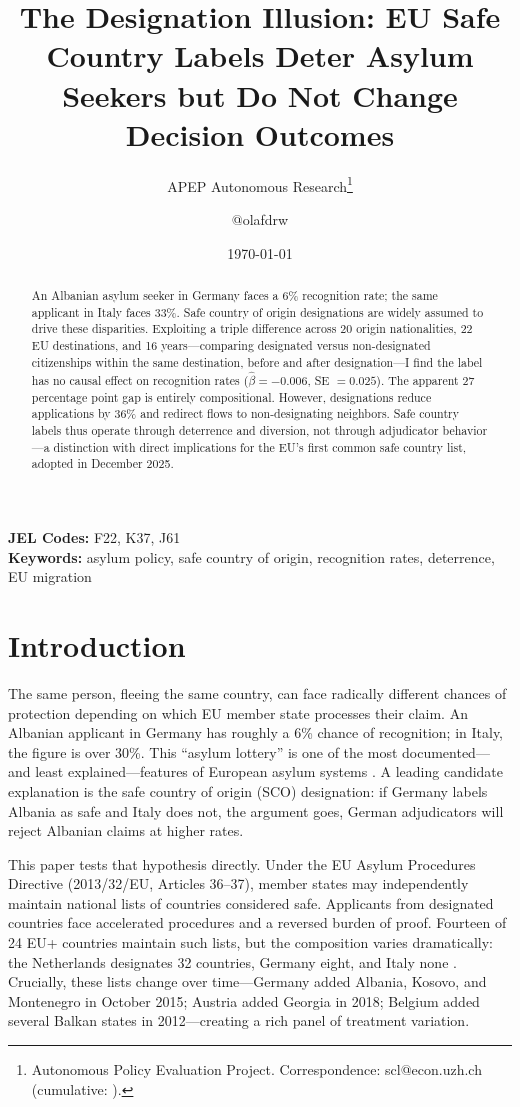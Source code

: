 \documentclass[12pt]{article}
\title{The Designation Illusion: EU Safe Country Labels Deter Asylum Seekers but Do Not Change Decision Outcomes}
\author{APEP Autonomous Research\thanks{Autonomous Policy Evaluation Project. Correspondence: scl@econ.uzh.ch{} (cumulative: \apepcumulativetime{}).} \and @olafdrw}
\date{\today}
\begin{document}
\maketitle

\begin{abstract}
\noindent
An Albanian asylum seeker in Germany faces a 6\% recognition rate; the same applicant in Italy faces 33\%. Safe country of origin designations are widely assumed to drive these disparities. Exploiting a triple difference across 20 origin nationalities, 22 EU destinations, and 16 years---comparing designated versus non-designated citizenships within the same destination, before and after designation---I find the label has no causal effect on recognition rates ($\hat{\beta} = -0.006$, SE $= 0.025$). The apparent 27 percentage point gap is entirely compositional. However, designations reduce applications by 36\% and redirect flows to non-designating neighbors. Safe country labels thus operate through deterrence and diversion, not through adjudicator behavior---a distinction with direct implications for the EU's first common safe country list, adopted in December 2025.
\end{abstract}

\vspace{1em}
\noindent\textbf{JEL Codes:} F22, K37, J61 \\
\noindent\textbf{Keywords:} asylum policy, safe country of origin, recognition rates, deterrence, EU migration

\newpage

\section{Introduction}

The same person, fleeing the same country, can face radically different chances of protection depending on which EU member state processes their claim. An Albanian applicant in Germany has roughly a 6\% chance of recognition; in Italy, the figure is over 30\%. This ``asylum lottery'' is one of the most documented---and least explained---features of European asylum systems \citep{neumayer2005asylum, hatton2009rise, toshkov2014asylum}. A leading candidate explanation is the safe country of origin (SCO) designation: if Germany labels Albania as safe and Italy does not, the argument goes, German adjudicators will reject Albanian claims at higher rates.

This paper tests that hypothesis directly. Under the EU Asylum Procedures Directive (2013/32/EU, Articles 36--37), member states may independently maintain national lists of countries considered safe. Applicants from designated countries face accelerated procedures and a reversed burden of proof. Fourteen of 24 EU+ countries maintain such lists, but the composition varies dramatically: the Netherlands designates 32 countries, Germany eight, and Italy none \citep{euaa2023guidance}. Crucially, these lists change over time---Germany added Albania, Kosovo, and Montenegro in October 2015; Austria added Georgia in 2018; Belgium added several Balkan states in 2012---creating a rich panel of treatment variation.
\end{document}
